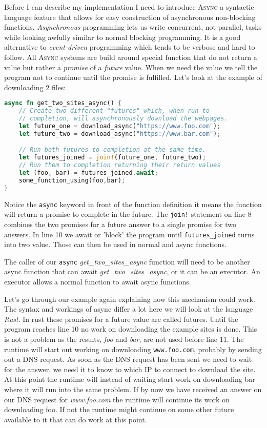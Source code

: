 Before I can describe my implementation I need to introduce \textsc{Async} a syntactic language feature that allows for easy construction of asynchronous non-blocking functions. \textit{Asynchronous} programming lets us write concurrent, not parallel, tasks while looking awfully similar to normal blocking programming. It is a good alternative to \textit{event-driven} programming which tends to be verbose and hard to follow. All \textsc{Async} systems are build around special function that do not return a value but rather a \textit{promise} of a \textit{future} value. When we need the value we tell the program not to continue until the promise is fulfilled. Let's look at the example of downloading 2 files:

\begin{lstlisting}[language=rust, style=boxed, tabsize=2]
async fn get_two_sites_async() {
	// Create two different "futures" which, when run to 
	// completion, will asynchronously download the webpages.
	let future_one = download_async("https://www.foo.com");
	let future_two = download_async("https://www.bar.com");

	// Run both futures to completion at the same time.
	let futures_joined = join!(future_one, future_two);
	// Run them to completion returning their return values
	let (foo, bar) = futures_joined.await;
	some_function_using(foo,bar);
}
\end{lstlisting}

Notice the \texttt{async} keyword in front of the function definition it means the function will return a promise to complete in the future. The \texttt{join!} statement on line 8 combines the two promises for a future answer to a single promise for two answers. In line 10 we await or 'block' the program until \texttt{futures\_joined} turns into two value. Those can then be used in normal and async functions.

The caller of our \texttt{async} \textit{get\_two\_sites\_async} function will need to be another async function that can await \textit{get\_two\_sites\_async}, or it can be an executor. An executor allows a normal function to await async functions.

Let's go through our example again explaining how this mechanism could work. The syntax and workings of async differ a lot here we will look at the language \textit{Rust}. In rust these promises for a future value are called futures. Until the program reaches line 10 no work on downloading the example sites is done. This is not a problem as the results, \textit{foo} and \textit{bar}, are not used before line 11. The runtime will start out working on downloading \texttt{www.foo.com}, probably by sending out a DNS request. As soon as the DNS request has been sent we need to wait for the answer, we need it to know to which IP to connect to download the site. At this point the runtime will instead of waiting start work on downloading bar where it will run into the same problem. If by now we have received an answer on our DNS request for \textit{www.foo.com} the runtime will continue its work on downloading foo. If not the runtime might continue on some other future available to it that can do work at this point.
